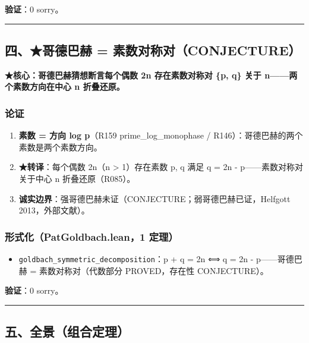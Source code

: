 \documentclass[
]{article}
\providecommand{\tightlist}{%
 \setlength{\itemsep}{0pt}\setlength{\parskip}{0pt}}
\begin{document}
\textbf{验证}：0 sorry。

\begin{center}\rule{0.5\linewidth}{0.5pt}\end{center}

\subsection{四、★哥德巴赫 =
素数对称对（CONJECTURE）}\label{ux56dbux54e5ux5fb7ux5df4ux8d6b-ux7d20ux6570ux5bf9ux79f0ux5bf9conjecture}

\textbf{★核心：哥德巴赫猜想断言每个偶数 2n 存在素数对称对 \{p, q\} 关于
n------两个素数方向在中心 n 折叠还原。}

\subsubsection{论证}\label{ux8bbaux8bc1-3}

\begin{enumerate}
\def\labelenumi{\arabic{enumi}.}
\tightlist
\item
 \textbf{素数 = 方向 log p}（R159 prime\_log\_monophase /
 R146）：哥德巴赫的两个素数是两个素数方向。
\item
 \textbf{★转译}：每个偶数 2n（n \textgreater{} 1）存在素数 p, q 满足 q
 = 2n - p------素数对称对关于中心 n 折叠还原（R085）。
\item
 \textbf{诚实边界}：强哥德巴赫未证（CONJECTURE；弱哥德巴赫已证，Helfgott
 2013，外部文献）。
\end{enumerate}

\subsubsection{形式化（PatGoldbach.lean，1
定理）}\label{ux5f62ux5f0fux5316patgoldbach.lean1-ux5b9aux7406-2}

\begin{itemize}
\tightlist
\item
 \texttt{goldbach\_symmetric\_decomposition}：p + q = 2n ⟺ q = 2n -
 p------哥德巴赫 = 素数对称对（代数部分 PROVED，存在性 CONJECTURE）。
\end{itemize}

\textbf{验证}：0 sorry。

\begin{center}\rule{0.5\linewidth}{0.5pt}\end{center}

\subsection{五、全景（组合定理）}\label{ux4e94ux5168ux666fux7ec4ux5408ux5b9aux7406}
\end{document}
